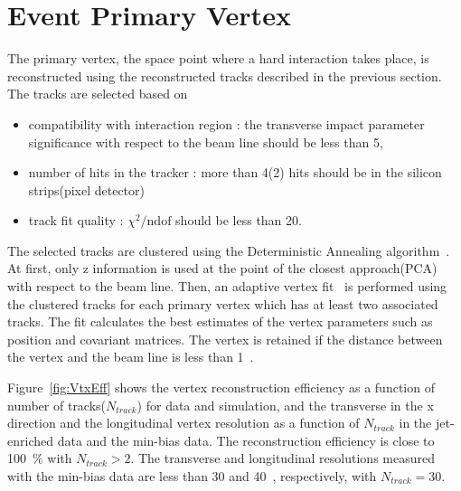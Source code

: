 \section{ Event Primary Vertex }

The primary vertex, the space point where a hard interaction takes place,
is reconstructed using the reconstructed tracks described in the previous section. 
The tracks are selected based on 
\begin{itemize}
\item compatibility with interaction region : the transverse impact parameter 
      significance with respect to the beam line should be less than 5, 
\item number of hits in the tracker : more than 4(2) hits should be 
      in the silicon strips(pixel detector) 
\item track fit quality : $\chi^2/\textrm{ndof}$ should be less than 20.
\end{itemize}
The selected tracks are clustered using the Deterministic Annealing 
algorithm~\cite{DAclustering}.
At first, only z information is used at the point of the closest approach(PCA) with 
respect to the beam line. 
Then, an adaptive vertex fit~\cite{AdaptiveVertexFit} is performed using the clustered tracks 
for each primary vertex
which has at least two associated tracks. The fit calculates the best estimates 
of the vertex parameters such as position and covariant matrices. 
The vertex is retained if the distance between the vertex and the beam line 
is less than 1~\cm.

Figure~\ref{fig:VtxEff} shows the vertex reconstruction efficiency as a function 
of number of tracks($N_{track}$) for data and simulation, 
and the transverse in the x direction and the longitudinal vertex resolution 
as a function of $N_{track}$ in the jet-enriched data and the min-bias data. 
The reconstruction efficiency is close to 100~\% with  
$N_{track}>2$. The transverse and longitudinal resolutions measured with 
the min-bias data are less than 30 and 40~\um, respectively, with $N_{track}=30$.

